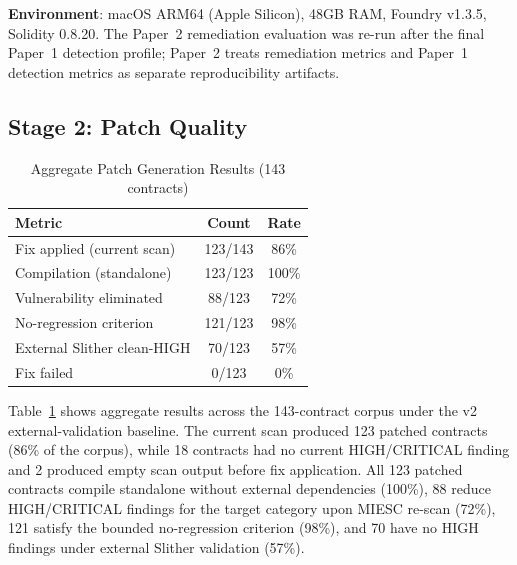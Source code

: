 \documentclass[conference]{IEEEtran}
\begin{document}
\textbf{Environment}: macOS ARM64 (Apple Silicon), 48GB RAM, Foundry v1.3.5, Solidity 0.8.20. The Paper~2 remediation evaluation was re-run after the final Paper~1 detection profile; Paper~2 treats remediation metrics and Paper~1 detection metrics as separate reproducibility artifacts.

\subsection{Stage 2: Patch Quality}

\begin{table}[htbp]
\caption{Aggregate Patch Generation Results (143 contracts)}
\label{tab:fix}
\centering
\begin{tabular}{@{}lcc@{}}
\toprule
\textbf{Metric} & \textbf{Count} & \textbf{Rate} \\
\midrule
Fix applied (current scan) & 123/143 & 86\% \\
Compilation (standalone) & 123/123 & 100\% \\
Vulnerability eliminated & 88/123 & 72\% \\
No-regression criterion & 121/123 & 98\% \\
External Slither clean-HIGH & 70/123 & 57\% \\
Fix failed & 0/123 & 0\% \\
\bottomrule
\end{tabular}
\end{table}

Table~\ref{tab:fix} shows aggregate results across the 143-contract corpus under the v2 external-validation baseline. The current scan produced 123 patched contracts (86\% of the corpus), while 18 contracts had no current HIGH/CRITICAL finding and 2 produced empty scan output before fix application. All 123 patched contracts compile standalone without external dependencies (100\%), 88 reduce HIGH/CRITICAL findings for the target category upon MIESC re-scan (72\%), 121 satisfy the bounded no-regression criterion (98\%), and 70 have no HIGH findings under external Slither validation (57\%).
\end{document}
